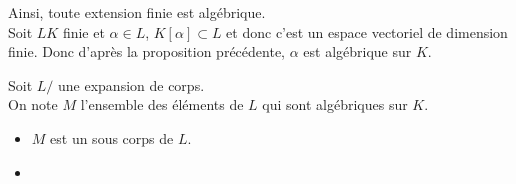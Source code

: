 \begin{remarque}
	Ainsi, toute extension finie est algébrique. \\
	Soit $LK$ finie et $\alpha \in L$, $K[\alpha] \subset L$ et donc c'est un espace vectoriel de dimension finie. Donc d'après la proposition précédente, $\alpha$ est algébrique sur $K$.
\end{remarque}

\begin{theorem} %
	Soit $L/$ une expansion de corps. \\
	On note $M$ l'ensemble des éléments de $L$ qui sont algébriques sur $K$.
	\begin{itemize}
		\item $M$ est un sous corps de $L$.
		\item
	\end{itemize}
\end{theorem}




